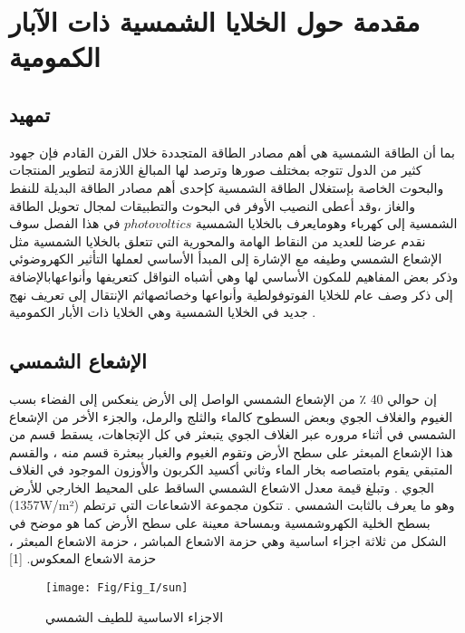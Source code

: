 \chapter{مقدمة حول الخلايا الشمسية ذات الآبار الكمومية}

\label{Chapter1}


\section {تمهيد }  
بما أن الطاقة الشمسية هي أهم مصادر الطاقة المتجددة خلال القرن القادم فإن جهود كثير من الدول تتوجه بمختلف صورها وترصد لها المبالغ اللازمة لتطوير المنتجات والبحوت الخاصة بإستغلال الطاقة الشمسية كإحدى أهم مصادر الطاقة البديلة للنفط والغاز ،وقد أعطى النصيب الأوفر في البحوث والتطبيقات لمجال تحويل الطاقة الشمسية إلى كهرباء وهومايعرف بالخلايا الشمسية  $ photovoltics   $             
في هذا الفصل سوف نقدم عرضا للعديد من النقاط الهامة والمحورية التي تتعلق بالخلايا الشمسية مثل الإشعاع الشمسي  وطيفه مع الإشارة إلى المبدأ الأساسي لعملها التأثير الكهروضوئي وذكر بعض المفاهيم للمكون الأساسي لها وهي أشباه النواقل كتعريفها وأنواعهابالإضافة إلى ذكر وصف عام للخلايا الفوتوفولطية وأنواعها وخصائصهاثم الإنتقال إلى تعريف نهج جديد في الخلايا الشمسية وهي الخلايا ذات الأبار الكمومية \cite{a2} .
\section {الإشعاع الشمسي  }
إن حوالي 40 ٪ من الإشعاع الشمسي الواصل إلى الأرض ينعكس إلى الفضاء بسب الغيوم والغلاف الجوي وبعض السطوح كالماء والثلج والرمل، والجزء الأخر من الإشعاع الشمسي في أثناء مروره عبر الغلاف الجوي يتبعثر في كل الإتجاهات، يسقط قسم من هذا الإشعاع المبعثر على سطح الأرض وتقوم الغيوم والغبار ببعثرة قسم منه ، والقسم المتبقي يقوم بامتصاصه بخار الماء وثاني أكسيد الكربون والأوزون الموجود في الغلاف الجوي . وتبلغ قيمة معدل الاشعاع الشمسي الساقط على المحيط الخارجي للأرض (1357W/m²) وهو ما يعرف بالثابت الشمسي .
تتكون مجموعة الاشعاعات التي ترتطم بسطح الخلية الكهروشمسية وبمساحة معينة على سطح الأرض كما هو موضح في الشكل من ثلاثة اجزاء اساسية وهي حزمة الاشعاع المباشر ، حزمة الاشعاع المبعثر ، حزمة الاشعاع المعكوس.  [1]

\begin{figure}[h!]
	\centering
	\texttt{[image: Fig/Fig\_I/sun]}
	\caption{الاجزاء الاساسية للطيف الشمسي}
	\label{fig:sun}
\end{figure}
\FloatBarrier

